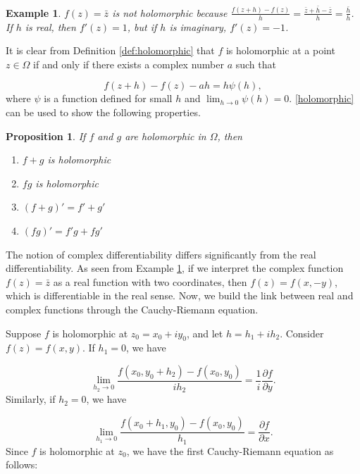 \documentclass{article}
\newtheorem{proposition}{Proposition}
\newtheorem{example}{Example}
\begin{document}
\begin{example} \label{ex:non_holomorphic}
$f(z)=\bar{z}$ is not holomorphic because $\frac{f(z+h)-f(z)}{h}=\frac{\bar{z}+\bar{h}-\bar{z}}{h}=\frac{\bar{h}}{h}$. If $h$ is real, then $f'(z)=1$, but if $h$ is imaginary, $f'(z)=-1$.
\end{example}

It is clear from Definition \ref{def:holomorphic} that $f$ is holomorphic at a point $z\in\Omega$ if and only if there exists a complex number $a$ such that 

\begin{equation} \label{holomorphic}
f(z+h)-f(z)-ah=h\psi(h),
\end{equation}
where $\psi$ is a function defined for small $h$ and $\lim_{h\rightarrow0}\psi(h)=0$. \eqref{holomorphic} can be used to show the following properties.

\begin{proposition}
If $f$ and $g$ are holomorphic in $\Omega$, then
\begin{enumerate}
\item
$f+g$ is holomorphic

\item
$fg$ is holomorphic

\item
$(f+g)'=f'+g'$

\item
$(fg)'=f'g+fg'$
\end{enumerate}
\end{proposition}

The notion of complex differentiability differs significantly from the real differentiability. As seen from Example \ref{ex:non_holomorphic}, if we interpret the complex function $f(z)=\bar{z}$ as a real function with two coordinates, then $f(z)=f(x,-y)$, which is differentiable in the real sense. Now, we build the link between real and complex functions through the Cauchy-Riemann equation. 

Suppose $f$ is holomorphic at $z_0=x_0+iy_0$, and let $h=h_1+ih_2$. Consider $f(z)=f(x,y)$. If $h_1=0$, we have

\begin{equation*}
\lim_{h_2\rightarrow0}\frac{f(x_0,y_0+h_2)-f(x_0,y_0)}{ih_2}=\frac{1}{i}\frac{\partial f}{\partial y}.
\end{equation*}
Similarly, if $h_2=0$, we have

\begin{equation*}
\lim_{h_1\rightarrow0}\frac{f(x_0+h_1,y_0)-f(x_0,y_0)}{h_1}=\frac{\partial f}{\partial x}.
\end{equation*}
Since $f$ is holomorphic at $z_0$, we have the first Cauchy-Riemann equation as follows:
\end{document}
